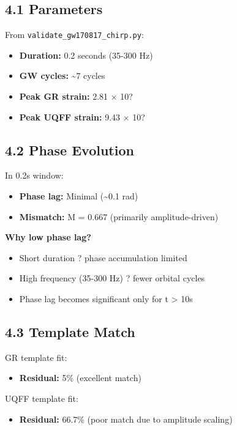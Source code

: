 \documentclass[11pt]{article}
\begin{document}
\subsection*{4.1 Parameters}

From \verb|validate_gw170817_chirp.py|:

\begin{itemize}
  \item \textbf{Duration:} 0.2 seconds (35-300 Hz)
  \item \textbf{GW cycles:} \textasciitilde{}7 cycles
  \item \textbf{Peak GR strain:} 2.81 $\times$ 10?
  \item \textbf{Peak UQFF strain:} 9.43 $\times$ 10?
\end{itemize}

\subsection*{4.2 Phase Evolution}

In 0.2s window:

\begin{itemize}
  \item \textbf{Phase lag:} Minimal (\textasciitilde{}0.1 rad)
  \item \textbf{Mismatch:} M = 0.667 (primarily amplitude-driven)
\end{itemize}

\textbf{Why low phase lag?}

\begin{itemize}
  \item Short duration ? phase accumulation limited
  \item High frequency (35-300 Hz) ? fewer orbital cycles
  \item Phase lag becomes significant only for t > 10s
\end{itemize}

\subsection*{4.3 Template Match}

GR template fit:

\begin{itemize}
  \item \textbf{Residual:} 5\% (excellent match)
\end{itemize}

UQFF template fit:

\begin{itemize}
  \item \textbf{Residual:} 66.7\% (poor match due to amplitude scaling)
\end{itemize}
\end{document}

